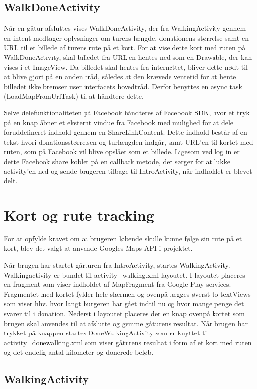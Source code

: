 \subsection{WalkDoneActivity}
Når en gåtur afsluttes vises WalkDoneActivity, der fra WalkingActivity gennem en intent modtager oplysninger om turens længde, donationens størrelse samt en URL til et billede af turens rute på et kort. For at vise dette kort med ruten på WalkDoneActivity, skal billedet fra URL’en hentes ned som en Drawable, der kan vises i et ImageView. Da billedet skal hentes fra internettet, bliver dette nødt til at blive gjort på en anden tråd, således at den krævede ventetid for at hente billedet ikke bremser user interfacets hovedtråd. Derfor benyttes en async task (LoadMapFromUrlTask) til at håndtere dette.

Selve delefunktionaliteten på Facebook håndteres af Facebook SDK, hvor et tryk på en knap åbner et eksternt vindue fra Facebook med mulighed for at dele foruddefineret indhold gennem en ShareLinkContent. Dette indhold består af en tekst hvori donationsstørrelsen og turlængden indgår, samt URL’en til kortet med ruten, som på Facebook vil blive opslået som et billede. Ligesom ved log in er dette Facebook share koblet på en callback metode, der sørger for at lukke activity’en ned og sende brugeren tilbage til IntroActivity, når indholdet er blevet delt.

\section{Kort og rute tracking}
For at opfylde kravet om at brugeren løbende skulle kunne følge sin rute på et kort, blev det valgt at anvende Googles Maps API i projektet.

Når brugen har startet gårturen fra IntroActivity, startes WalkingActivity. Walkingactivity er bundet til activity\_walking.xml layoutet. I layoutet placeres en fragment som viser indholdet af MapFragment fra Google Play services. Fragmentet med kortet fylder hele slærmen og ovenpå lægges øverst to textViews som viser hhv. hvor langt burgeren har gået indtil nu og hvor mange penge det svarer til i donation.
Nederst i layoutet placeres der en knap ovenpå kortet som brugen skal anvendes til at afslutte og gemme gåturens resultat. Når brugen har trykket på knappen startes DoneWalkingActivity som er knyttet til activity\_donewalking.xml som viser gåturens resultat i form af et kort med ruten og det endelig antal kilometer og donerede beløb.

\subsection{WalkingActivity}

